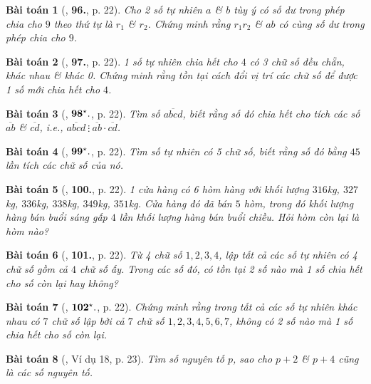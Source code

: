 \documentclass{article}
\numberwithin{equation}{section}
\newtheorem{baitoan}{Bài toán}[section]
\begin{document}
\begin{baitoan}[\cite{Binh_Toan_6_tap_1}, \textbf{96.}, p. 22]
	Cho 2 số tự nhiên $a$ \& $b$ tùy ý có số dư trong phép chia cho $9$ theo thứ tự là $r_1$ \& $r_2$. Chứng minh rằng $r_1r_2$ \& $ab$ có cùng số dư trong phép chia cho $9$.
\end{baitoan}

\begin{baitoan}[\cite{Binh_Toan_6_tap_1}, \textbf{97.}, p. 22]
	1 số tự nhiên chia hết cho $4$ có 3 chữ số đều chẵn, khác nhau \& khác 0. Chứng minh rằng tồn tại cách đổi vị trí các chữ số để được 1 số mới chia hết cho $4$.
\end{baitoan}

\begin{baitoan}[\cite{Binh_Toan_6_tap_1}, $\bf 98^\star.$, p. 22]
	Tìm số $\overline{abcd}$, biết rằng số đó chia hết cho tích các số $\overline{ab}$ \& $\overline{cd}$, i.e., $\overline{abcd}\ \vdots\ \overline{ab}\cdot\overline{cd}$.
\end{baitoan}

\begin{baitoan}[\cite{Binh_Toan_6_tap_1}, $\bf 99^\star.$, p. 22]
	Tìm số tự nhiên có 5 chữ số, biết rằng số đó bằng $45$ lần tích các chữ số của nó.
\end{baitoan}	

\begin{baitoan}[\cite{Binh_Toan_6_tap_1}, \textbf{100.}, p. 22]
	1 cửa hàng có 6 hòm hàng với khối lượng $316$kg, $327$kg, $336$kg, $338$kg, $349$kg, $351$kg. Cửa hàng đó đã bán $5$ hòm, trong đó khối lượng hàng bán buổi sáng gấp $4$ lần khối lượng hàng bán buổi chiều. Hỏi hòm còn lại là hòm nào?
\end{baitoan}

\begin{baitoan}[\cite{Binh_Toan_6_tap_1}, \textbf{101.}, p. 22]
	Từ 4 chữ số $1,2,3,4$, lập tất cả các số tự nhiên có 4 chữ số gồm cả $4$ chữ số ấy. Trong các số đó, có tồn tại 2 số nào mà 1 số chia hết cho số còn lại hay không?
\end{baitoan}

\begin{baitoan}[\cite{Binh_Toan_6_tap_1}, $\bf 102^\star.$, p. 22]
	Chứng minh rằng trong tất cả các số tự nhiên khác nhau có $7$ chữ số lập bởi cả $7$ chữ số $1,2,3,4,5,6,7$, không có 2 số nào mà 1 số chia hết cho số còn lại.
\end{baitoan}

\begin{baitoan}[\cite{Binh_Toan_6_tap_1}, Ví dụ 18, p. 23]
	Tìm số nguyên tố $p$, sao cho $p + 2$ \& $p + 4$ cũng là các số nguyên tố.
\end{baitoan}
\end{document}
